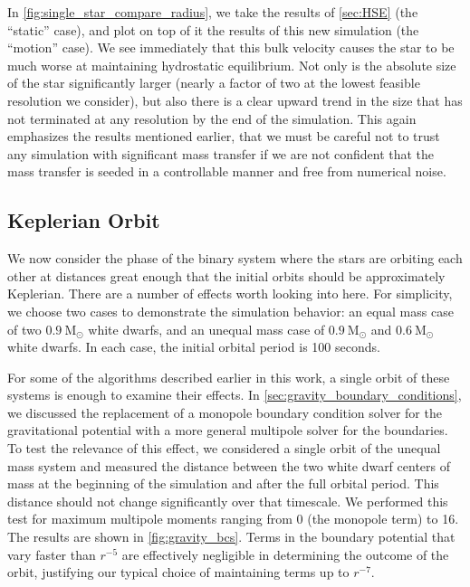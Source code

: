 \documentclass[iop]{../emulateapj}
\newcommand{\msolar}{\mathrm{M}_\odot}
\begin{document}
In \autoref{fig:single_star_compare_radius}, we take the results of
\autoref{sec:HSE} (the ``static'' case), and plot on top of it the
results of this new simulation (the ``motion'' case). We see
immediately that this bulk velocity causes the star to be much worse
at maintaining hydrostatic equilibrium. Not only is the absolute size
of the star significantly larger (nearly a factor of two at the lowest
feasible resolution we consider), but also there is a clear upward
trend in the size that has not terminated at any resolution by the end
of the simulation.  This again emphasizes the results mentioned
earlier, that we must be careful not to trust any simulation with
significant mass transfer if we are not confident that the mass
transfer is seeded in a controllable manner and free from numerical
noise.

\subsection{Keplerian Orbit}\label{sec:kepler}

We now consider the phase of the binary system where the stars are orbiting each other 
at distances great enough that the initial orbits should be approximately Keplerian. 
There are a number of effects worth looking into here. For simplicity, we choose two 
cases to demonstrate the simulation behavior: an equal mass case of two $0.9\ \msolar$ 
white dwarfs, and an unequal mass case of $0.9\ \msolar$ and $0.6\ \msolar$ white dwarfs.
In each case, the initial orbital period is 100 seconds.

For some of the algorithms described earlier in this work, a single orbit of these 
systems is enough to examine their effects. In \autoref{sec:gravity_boundary_conditions},
we discussed the replacement of a monopole boundary condition solver for the gravitational 
potential with a more general multipole solver for the boundaries. To test the relevance 
of this effect, we considered a single orbit of the unequal mass system and measured 
the distance between the two white dwarf centers of mass at the beginning of the simulation and after 
the full orbital period. This distance should not change significantly over that timescale.
We performed this test for maximum multipole moments ranging from 0 (the monopole term) to 16.
The results are shown in \autoref{fig:gravity_bcs}. Terms in the boundary potential 
that vary faster than $r^{-5}$ are effectively negligible in determining the outcome of the orbit, 
justifying our typical choice of maintaining terms up to $r^{-7}$.
\end{document}
